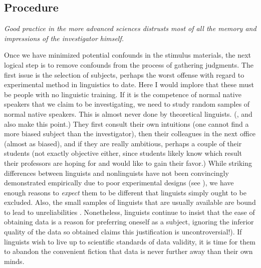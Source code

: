  \subsection{Procedure}\label{sec:6.3.2}

 \epigraph{\itshape Good practice in the more advanced sciences distrusts most of all the memory and impressions of the investigator himself.\\[-2\baselineskip]}{\citep{Labov1978}}

 \noindent Once we have minimized potential confounds in the stimulus materials, the next logical step is to remove confounds from the process of gathering judgments. The first issue is the selection of subjects, perhaps the worst offense with regard to experimental method in linguistics to date. Here I would implore that these must be people with no linguistic training. If it is the competence of normal native speakers that we claim to be investigating, we need to study random samples
 of normal native speakers. This is almost never done by theoretical linguists. (\citet{Bolinger1968}, \citet{Greenbaum1976a} and \citet{Derwing1979} also make this point.) They first consult their own intuitions (one cannot find a more biased subject than the investigator), then their colleagues in the next office (almost as biased), and if they are really ambitious, perhaps a couple of their students (not exactly objective either, since students likely know which result their professors are hoping for and would like to gain their favor.) While striking differences between linguists and nonlinguists have not been convincingly demonstrated empirically due to poor experimental designs (see ), we have enough reasons to \textit{expect} them to be different that linguists simply ought to be excluded. Also, the small samples of linguists that are usually available are bound to lead to unreliabilities \citep{BradacEtAl1980}. Nonetheless, linguists continue to insist that the ease of obtaining data is a reason for preferring oneself as a subject, ignoring the inferior quality of the data so obtained \citep[50]{Newmeyer1983}
 claims this justification is uncontroversial!). If linguists wish to live up to scientific standards of data validity, it is time for them to abandon the convenient fiction that data is never further away than their own minds.

